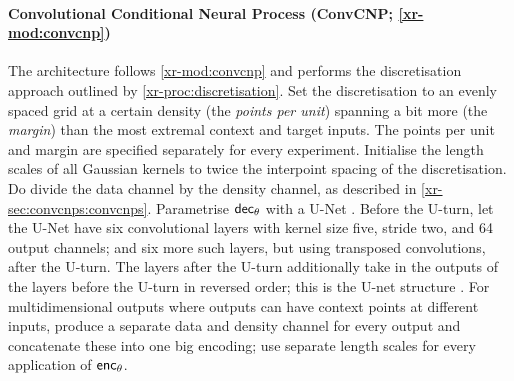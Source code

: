 \documentclass[12pt]{report}
\newcommand{\xrprefix}[1]{xr-#1}
\begin{document}
\paragraph{Convolutional Conditional Neural Process (ConvCNP; \cref{\xrprefix{mod:convcnp}})}
The architecture follows \cref{\xrprefix{mod:convcnp}} and performs the discretisation approach outlined by \eqref{\xrprefix{proc:discretisation}}.
Set the discretisation to an evenly spaced grid at a certain density (the \emph{points per unit}) spanning a bit more (the \emph{margin}) than the most extremal context and target inputs.
The points per unit and margin are specified separately for every experiment.
Initialise the length scales of all Gaussian kernels to twice the interpoint spacing of the discretisation.
Do divide the data channel by the density channel, as described in \cref{\xrprefix{sec:convcnps:convcnps}}.
Parametrise $\mathsf{dec}_\theta$ with a 
U-Net \parencite{Ronneberger:2015:U-Net_Convolutional_Networks_for_Biomedical}.
Before the U-turn, let the U-Net have six convolutional layers with kernel size five, stride two, and 64 output channels;
and six more such layers, but using transposed convolutions, after the U-turn.
The layers after the U-turn additionally take in the outputs of the layers before the U-turn in reversed order;
this is the U-net structure \parencite[Figure 1;][]{Ronneberger:2015:U-Net_Convolutional_Networks_for_Biomedical}.
For multidimensional outputs where outputs can have context points at different inputs, produce a separate data and density channel for every output and concatenate these into one big encoding;
use separate length scales for every application of $\mathsf{enc}_\theta$.
\end{document}

